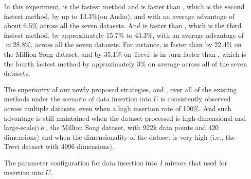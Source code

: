 In this experiment, \cpdualtree is the fastest method and is faster than \spdualtree, which is the second fastest method, by up to 13.3\%(on Audio), and with an average advantage of about 6.5\% across all the seven datasets. And \spdualtree is faster than \deltatree, which is the third fastest method, by approximately 15.7\% to 43.3\%, with an average advantage of $\approx 28.8\%$, across all the seven datasets. For instance, \spdualtree is faster than \deltatree by 22.4\% on the Million Song dataset, and by 35.1\% on Trevi. \deltatree is in turn faster than \dualtree, which is the fourth fastest method by approximately 3\% on average across all of the seven datasets. 

The superiority of our newly proposed strategies, \cpdualtree and \spdualtree, over all of the existing methods under the scenario of data insertion into $U$ is consistently observed across multiple datasets, even when a high insertion rate of 100\%. And such advantage is still maintained when the dataset processed is high-dimensional and large-scale(i.e., the Million Song dataset, with 922k data points and 420 dimensions) and when the dimensionality of the dataset is very high (i.e., the Trevi dataset with 4096 dimensions).

The parameter configuration for data insertion into $I$ mirrors that used for insertion into $U$.

